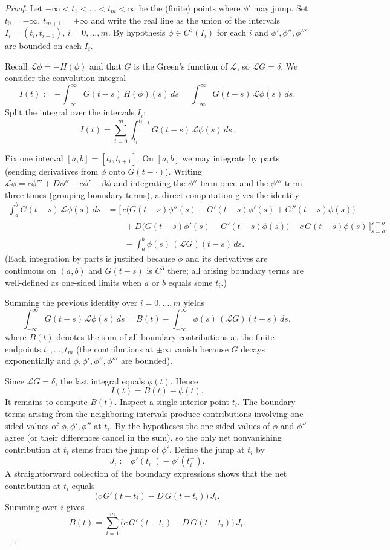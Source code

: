 \documentclass[12pt,letterpaper]{amsart}
\theoremstyle{definition}
\theoremstyle{remark}
\numberwithin{equation}{section}
\begin{document}
 \begin{proof}
 	Let $-\infty<t_1<\dots<t_m<\infty$ be the (finite) points where $\phi'$ may jump.
 	Set $t_0=-\infty$, $t_{m+1}=+\infty$ and write the real line as the union of the
 	intervals $I_i=(t_i,t_{i+1})$, $i=0,\dots,m$. By hypothesis $\phi\in C^3(I_i)$ for
 	each $i$ and $\phi',\phi'',\phi'''$ are bounded on each $I_i$.
 	
 	Recall $\mathcal L\phi=-H(\phi)$ and that $G$ is the Green's function of $\mathcal L$,
 	so $\mathcal L G=\delta$. We consider the convolution integral
 	\[
 	I(t):=-\int_{-\infty}^{\infty} G(t-s)\,H(\phi)(s)\,ds
 	=\int_{-\infty}^{\infty} G(t-s)\,\mathcal L\phi(s)\,ds.
 	\]
 	Split the integral over the intervals $I_i$:
 	\[
 	I(t)=\sum_{i=0}^m \int_{t_i}^{t_{i+1}} G(t-s)\,\mathcal L\phi(s)\,ds.
 	\]
 	
 	Fix one interval $[a,b]=[t_i,t_{i+1}]$. On $[a,b]$ we may integrate by parts
 	(sending derivatives from $\phi$ onto $G(t-\cdot)$). Writing $\mathcal L\phi=
 	c\phi''' + D\phi'' - c\phi' - \beta\phi$ and integrating the $\phi''$-term once
 	and the $\phi'''$-term three times (grouping boundary terms), a direct computation
 	gives the identity
 	\[
 	\begin{aligned}
 		\int_a^b G(t-s)\,\mathcal L\phi(s)\,ds
 		&= \Big[\,c\big(G(t-s)\phi''(s)-G'(t-s)\phi'(s)+G''(t-s)\phi(s)\big)\\
 		&\qquad + D\big(G(t-s)\phi'(s)-G'(t-s)\phi(s)\big)-c\,G(t-s)\phi(s)\,\Big]_{s=a}^{s=b}\\
 		&\qquad -\int_a^b \phi(s)\,(\mathcal L G)(t-s)\,ds.
 	\end{aligned}
 	\]
 	(Each integration by parts is justified because $\phi$ and its derivatives are
 	continuous on $(a,b)$ and $G(t-s)$ is $C^3$ there; all arising boundary terms are
 	well-defined as one-sided limits when $a$ or $b$ equals some $t_i$.)
 	
 	Summing the previous identity over $i=0,\dots,m$ yields
 	\[
 	\int_{-\infty}^{\infty} G(t-s)\,\mathcal L\phi(s)\,ds
 	= B(t) - \int_{-\infty}^{\infty}\phi(s)\,(\mathcal L G)(t-s)\,ds,
 	\]
 	where $B(t)$ denotes the sum of all boundary contributions at the finite endpoints
 	$t_1,\dots,t_m$ (the contributions at $\pm\infty$ vanish because $G$ decays
 	exponentially and $\phi,\phi',\phi'',\phi'''$ are bounded).
 	
 	Since $\mathcal L G=\delta$, the last integral equals $\phi(t)$. Hence
 	\[
 	I(t)=B(t)-\phi(t).
 	\]
 	It remains to compute $B(t)$. Inspect a single interior point $t_i$. The boundary
 	terms arising from the neighboring intervals produce contributions involving
 	one-sided values of $\phi,\phi',\phi''$ at $t_i$. By the hypotheses the one-sided
 	values of $\phi$ and $\phi''$ agree (or their differences cancel in the sum),
 	so the only net nonvanishing contribution at $t_i$ stems from the jump of $\phi'$.
 	Define the jump at $t_i$ by
 	\[
 	J_i:=\phi'(t_i^-)-\phi'(t_i^+).
 	\]
 	A straightforward collection of the boundary expressions shows that the net
 	contribution at $t_i$ equals
 	\[
 	\bigl(c\,G'(t-t_i)-D\,G(t-t_i)\bigr)\,J_i.
 	\]
 	Summing over $i$ gives
 	\[
 	B(t)=\sum_{i=1}^m \bigl(c\,G'(t-t_i)-D\,G(t-t_i)\bigr)\,J_i.
 	\]
 	

\end{proof}
\end{document}
